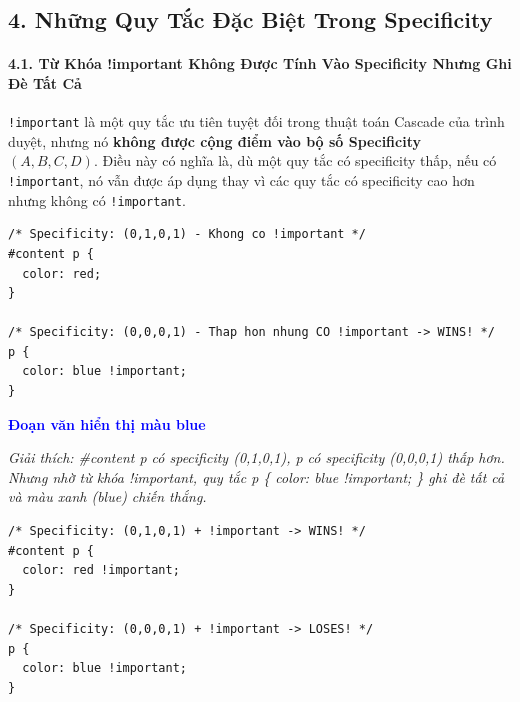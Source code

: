 \documentclass[11pt,oneside]{book}
\newcommand{\codeinline}[1]{\textcolor{accentOrange}{\texttt{#1}}}
\begin{document}
\subsection{4. Những Quy Tắc Đặc Biệt Trong Specificity}

\paragraph{4.1. Từ Khóa !important Không Được Tính Vào Specificity Nhưng Ghi Đè Tất Cả}

\begin{conceptBox}
\codeinline{!important} là một quy tắc ưu tiên tuyệt đối trong thuật toán Cascade của trình duyệt, nhưng nó \textbf{không được cộng điểm vào bộ số Specificity $(A,B,C,D)$}. Điều này có nghĩa là, dù một quy tắc có specificity thấp, nếu có \codeinline{!important}, nó vẫn được áp dụng thay vì các quy tắc có specificity cao hơn nhưng không có \codeinline{!important}.
\end{conceptBox}

\begin{codeWindow}
\begin{lstlisting}[language=CSS3]
/* Specificity: (0,1,0,1) - Khong co !important */
#content p {
  color: red;
}

/* Specificity: (0,0,0,1) - Thap hon nhung CO !important -> WINS! */
p {
  color: blue !important;
}
\end{lstlisting}
\end{codeWindow}

\begin{browserWindow}
\sffamily\small
\textcolor{blue}{\textbf{Đoạn văn hiển thị màu blue}} \par\vspace{4pt}
{\scriptsize\textcolor{gray!60}{\textit{Giải thích: \#content p có specificity (0,1,0,1), p có specificity (0,0,0,1) thấp hơn. Nhưng nhờ từ khóa !important, quy tắc p \{ color: blue !important; \} ghi đè tất cả và màu xanh (blue) chiến thắng.}}}
\end{browserWindow}

\begin{codeWindow}
\begin{lstlisting}[language=CSS3]
/* Specificity: (0,1,0,1) + !important -> WINS! */
#content p {
  color: red !important;
}

/* Specificity: (0,0,0,1) + !important -> LOSES! */
p {
  color: blue !important;
}
\end{lstlisting}
\end{codeWindow}
\end{document}
